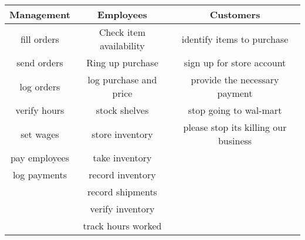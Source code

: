 \documentclass{letter}
\begin{document}
\begin{enumerate}
		\begin{tabular}{c | c | c}
		Management & Employees & Customers \\ \hline
		fill orders & Check item availability & identify items to purchase\\
		send orders & Ring up purchase & sign up for store account\\
		log orders & log purchase and price & provide the necessary payment\\
		verify hours & stock shelves & stop going to wal-mart\\
		set wages & store inventory & please stop its killing our business\\
		pay employees & take inventory &\\
		log payments & record inventory &\\
		 & record shipments &\\
		 & verify inventory &\\
		 & track hours worked &
		\end{tabular}
\end{enumerate}
\end{document}
